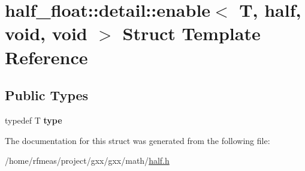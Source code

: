 \hypertarget{structhalf__float_1_1detail_1_1enable_3_01T_00_01half_00_01void_00_01void_01_4}{}\section{half\+\_\+float\+:\+:detail\+:\+:enable$<$ T, half, void, void $>$ Struct Template Reference}
\label{structhalf__float_1_1detail_1_1enable_3_01T_00_01half_00_01void_00_01void_01_4}
\subsection*{Public Types}
\begin{DoxyCompactItemize}
\item 
typedef T {\bfseries type}\hypertarget{structhalf__float_1_1detail_1_1enable_3_01T_00_01half_00_01void_00_01void_01_4_a3622a516453af349d6f6c29f393e7922}{}\label{structhalf__float_1_1detail_1_1enable_3_01T_00_01half_00_01void_00_01void_01_4_a3622a516453af349d6f6c29f393e7922}

\end{DoxyCompactItemize}


The documentation for this struct was generated from the following file\+:\begin{DoxyCompactItemize}
\item 
/home/rfmeas/project/gxx/gxx/math/\hyperlink{half_8h}{half.\+h}\end{DoxyCompactItemize}
